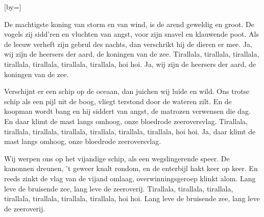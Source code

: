  

[by=]




\beginverse
De machtigste koning van storm en van wind, \brk  is de arend geweldig en groot.
De vogels zij sidd'ren en vluchten van angst, \brk  voor zijn snavel en klauwende poot.
Als de leeuw verheft zijn gebrul des nachts, \brk  dan verschrikt hij de dieren er mee.
Ja, wij zijn de heersers der aard, \brk  de koningen van de zee.
Tirallala, tirallala, tirallala, tirallala, \brk  tirallala, tirallala, tirallala, hoi hoi.
Ja, wij zijn de heersers der aard, \brk  de koningen van de zee.
\endverse

\beginverse
Verschijnt er een schip op de oceaan, \brk  dan juichen wij luide en wild.
Ons trotse schip als een pijl uit de boog, \brk  vliegt terstond door de wateren zilt.
En de koopman wordt bang en hij siddert van angst, \brk  de matrozen verwensen die dag.
En daar klimt de mast langs omhoog, \brk  onze bloedrode zeeroversvlag.
Tirallala, tirallala, tirallala, tirallala, \brk  tirallala, tirallala, tirallala, hoi hoi.
Ja, daar klimt de mast langs omhoog, \brk  onze bloedrode zeeroversvlag.
\endverse

\beginverse
Wij werpen ons op het vijandige schip, \brk  als een wegslingerende speer.
De kanonnen dreunen, 't geweer knalt rondom, \brk  en de enterbijl hakt keer op keer.
En reeds zinkt de vlag van de vijand omlaag, \brk  overwinningsgeroep klinkt alom.
Lang leve de bruisende zee, \brk  lang leve de zeeroverij.
Tirallala, tirallala, tirallala, tirallala, \brk  tirallala, tirallala, tirallala, hoi hoi.
Lang leve de bruisende zee, \brk  lang leve de zeeroverij.
\endverse




\endsong
